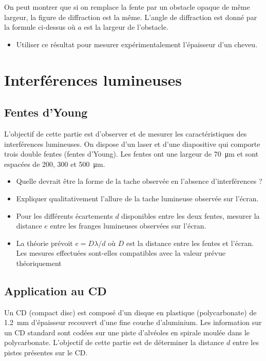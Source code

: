 \documentclass{tp}
\begin{document}
On peut montrer que si on remplace la fente par un obstacle opaque de même largeur, la figure de diffraction est la même. L'angle de diffraction est donné par la formule ci-dessus où $a$ est la largeur de l'obstacle.

\begin{itemize}
  \item Utiliser ce résultat pour mesurer expérimentalement l'épaisseur d'un cheveu.
\end{itemize}




\section{Interférences lumineuses}
\subsection{Fentes d'Young}%
\label{sub:fentes_d_young}

L'objectif de cette partie est d'observer et de mesurer les caractéristiques des interférences lumineuses. On dispose d'un laser et d'une diapositive qui comporte trois double fentes (fentes d'Young). Les fentes ont une largeur de \SI{70}{\micro\meter} et sont espacées de 200, 300 et \SI{500}{\micro\meter}.
\begin{itemize}
\item Quelle devrait être la forme de la tache observée en l'absence d'interférences ?
\item Expliquer qualitativement l'allure de la tache lumineuse observée sur l'écran.
\item Pour les différents écartements $d$ disponibles entre les deux fentes, mesurer la distance $e$ entre les franges lumineuses observées sur l'écran. 
\item La théorie prévoit $e=D\lambda/d$ où $D$ est la distance entre les fentes et l'écran. Les mesures effectuées sont-elles compatibles avec la valeur prévue théoriquement
\end{itemize}

\subsection{Application au CD}%
\label{sub:application_au_cd}
Un CD (compact disc) est composé d'un disque en plastique (polycarbonate) de \SI{1.2}{mm} d'épaisseur recouvert d'une fine couche d'aluminium. Les information sur un CD standard sont codées sur une piste d'alvéoles en spirale moulée dans le polycarbonate. L'objectif de cette partie est de déterminer la distance $d$ entre les pistes présentes sur le CD.
\end{document}
